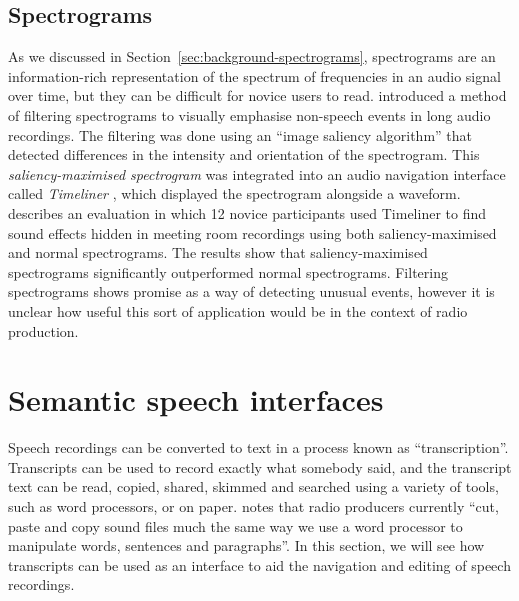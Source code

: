 \subsection{Spectrograms}




As we discussed in Section~\ref{sec:background-spectrograms}, spectrograms are an information-rich representation of
the spectrum of frequencies in an audio signal over time, but they can be difficult for novice users to read.
\citet{Lin2012} introduced a method of filtering spectrograms to visually emphasise non-speech events in long audio
recordings. The filtering was done using an ``image saliency algorithm'' that detected differences in the intensity and
orientation of the spectrogram. This \textit{saliency-maximised spectrogram} was integrated into an audio
navigation interface called \textit{Timeliner} \citep{Goudeseune2012}, which displayed the spectrogram alongside a
waveform. \citet{Lin2013} describes an evaluation in which 12 novice participants used Timeliner to find sound effects
hidden in meeting room recordings using both saliency-maximised and normal spectrograms. The results show that
saliency-maximised spectrograms significantly outperformed normal spectrograms.  Filtering spectrograms shows promise as
a way of detecting unusual events, however it is unclear how useful this sort of application would be in the context of
radio production.























\clearpage
\section{Semantic speech interfaces}\label{sec:background-transcripts}

Speech recordings can be converted to text in a process known as ``transcription''. Transcripts can be used to record
exactly what somebody said, and the transcript text can be read, copied, shared, skimmed and searched using a variety
of tools, such as word processors, or on paper.  \citet[p.~133]{Hausman2012} notes that radio producers currently
``cut, paste and copy sound files much the same way we use a word processor to manipulate words, sentences and
paragraphs''.  In this section, we will see how transcripts can be used as an interface to aid the navigation and
editing of speech recordings.

